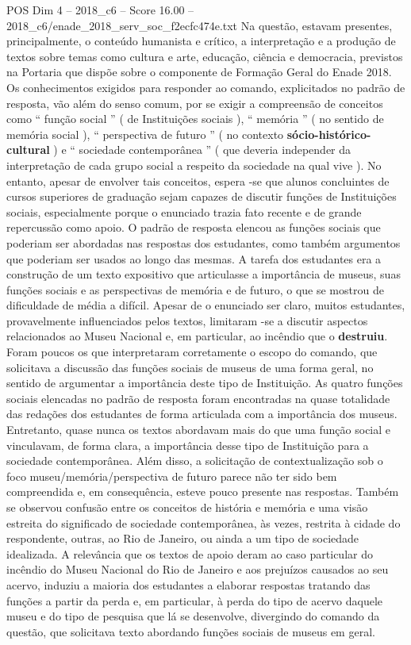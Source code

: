 \begin{textsample}{POS Dim 4 – 2018\_c6 – Score 16.00 – 2018\_c6/enade\_2018\_serv\_soc\_f2ecfc474e.txt}
Na questão, estavam presentes, principalmente, o conteúdo humanista e crítico, a interpretação e a produção de textos sobre temas como cultura e arte, educação, ciência e democracia, previstos na Portaria que dispõe sobre o componente de Formação Geral do Enade 2018.
Os conhecimentos exigidos para responder ao comando, explicitados no padrão de resposta, vão além do senso comum, por se exigir a compreensão de conceitos como “ função social ” ( de Instituições sociais ), “ memória ” ( no sentido de memória social ), “ perspectiva de futuro ” ( no contexto \textbf{sócio-histórico-cultural} ) e “ sociedade contemporânea ” ( que deveria independer da interpretação de cada grupo social a respeito da sociedade na qual vive ).
No entanto, apesar de envolver tais conceitos, espera -se que alunos concluintes de cursos superiores de graduação sejam capazes de discutir funções de Instituições sociais, especialmente porque o enunciado trazia fato recente e de grande repercussão como apoio.
O padrão de resposta elencou as funções sociais que poderiam ser abordadas nas respostas dos estudantes, como também argumentos que poderiam ser usados ao longo das mesmas.
A tarefa dos estudantes era a construção de um texto expositivo que articulasse a importância de museus, suas funções sociais e as perspectivas de memória e de futuro, o que se mostrou de dificuldade de média a difícil.
Apesar de o enunciado ser claro, muitos estudantes, provavelmente influenciados pelos textos, limitaram -se a discutir aspectos relacionados ao Museu Nacional e, em particular, ao incêndio que o \textbf{destruiu}.
Foram poucos os que interpretaram corretamente o escopo do comando, que solicitava a discussão das funções sociais de museus de uma forma geral, no sentido de argumentar a importância deste tipo de Instituição.
As quatro funções sociais elencadas no padrão de resposta foram encontradas na quase totalidade das redações dos estudantes de forma articulada com a importância dos museus.
Entretanto, quase nunca os textos abordavam mais do que uma função social e vinculavam, de forma clara, a importância desse tipo de Instituição para a sociedade contemporânea.
Além disso, a solicitação de contextualização sob o foco museu/memória/perspectiva de futuro parece não ter sido bem compreendida e, em consequência, esteve pouco presente nas respostas.
Também se observou confusão entre os conceitos de história e memória e uma visão estreita do significado de sociedade contemporânea, às vezes, restrita à cidade do respondente, outras, ao Rio de Janeiro, ou ainda a um tipo de sociedade idealizada.
A relevância que os textos de apoio deram ao caso particular do incêndio do Museu Nacional do Rio de Janeiro e aos prejuízos causados ao seu acervo, induziu a maioria dos estudantes a elaborar respostas tratando das funções a partir da perda e, em particular, à perda do tipo de acervo daquele museu e do tipo de pesquisa que lá se desenvolve, divergindo do comando da questão, que solicitava texto abordando funções sociais de museus em geral.

\end{textsample}
